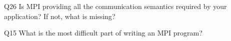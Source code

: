 \begin{description}%
\item{Q26} Is MPI providing all the communication semantics required by your application? If not, what is missing?%
\item{Q15} What is the most difficult part of writing an MPI program?%
\end{description}%
